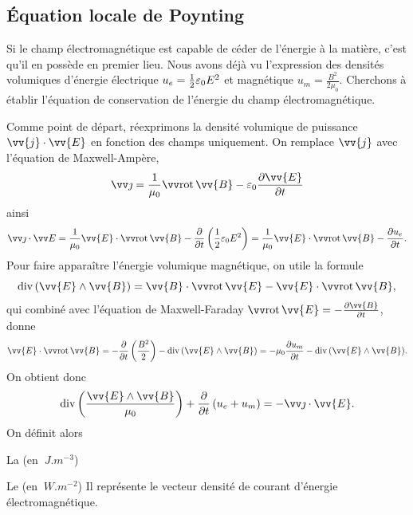 \documentclass[12pt,fancy]{cours}
\begin{document}
\subsection{Équation locale de Poynting}
Si le champ électromagnétique est capable de céder de l'énergie à la matière, c'est qu'il en possède en premier lieu. Nous avons déjà vu l'expression des densités volumiques d'énergie électrique $u_e = \frac{1}{2}\varepsilon_0 E^2$ et magnétique $u_m = \frac{B^2}{2\mu_0}$. Cherchons à établir l'équation de conservation de l'énergie du champ électromagnétique.


Comme point de départ, réexprimons la densité volumique de puissance $\vv{j}\cdot\vv{E}$ en fonction des champs uniquement. On remplace $\vv{j}$ avec l'équation de Maxwell-Ampère,
\begin{equation}
\j =\frac{1}{\mu_0}\rot{\vv{B}}-\varepsilon_0\frac{\partial \vv{E}}{\partial t}
\end{equation}
ainsi
\begin{equation}
\j \ps \E =\frac{1}{\mu_0}\vv{E}\cdot\rot{\vv{B}}-\frac{\partial}{\partial t}\left(\frac{1}{2}\varepsilon_0 E^{2}\right) =  \frac{1}{\mu_0}\vv{E}\cdot\rot{\vv{B}}-\frac{\partial u_e}{\partial t}.
\end{equation}
Pour faire apparaître l'énergie volumique magnétique, on utile la formule
\begin{equation}
  \dive{(\vv{E}\pv\vv{B})}=\vv{B}\cdot\rot{\vv{E}}-\vv{E}\cdot\rot{\vv{B}},
\end{equation}
qui combiné avec l'équation de Maxwell-Faraday $\rot{\vv{E}}=-\frac{\partial \vv{B}}{\partial t}$, donne
\begin{equation}
  \vv{E}\cdot\rot{\vv{B}} = -\frac{\partial}{\partial t}\left(\frac{B^2}{2}\right)-\dive{(\vv{E}\pv\vv{B})}  = -\mu_0 \dr{u_m}{t} - \dive{(\vv{E}\pv\vv{B})}  .
\end{equation}
On obtient donc
\begin{equation}
  \dive{\left(\frac{\vv{E}\pv\vv{B}}{\mu_0}\right)}+\dr{}{t}\left(u_e+u_m\right) = -\j\cdot\vv{E}.
\end{equation}
On définit alors
\begin{liste}
  \item La  (en $\SI{}{J.m^{-3}}$)
  \item Le  (en $\SI{}{W.m^{-2}}$)
  Il représente le vecteur densité de courant d'énergie électromagnétique.
\end{liste}
\end{document}
